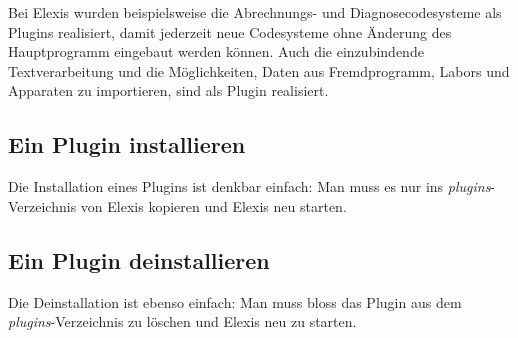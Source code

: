 Bei Elexis wurden beispielsweise die Abrechnungs- und Diagnosecodesysteme als Plugins realisiert, damit jederzeit neue Codesysteme ohne Änderung des Hauptprogramm eingebaut werden können. Auch die einzubindende Textverarbeitung und die Möglichkeiten, Daten aus Fremdprogramm, Labors und Apparaten zu importieren, sind als Plugin realisiert.

\subsection{Ein Plugin installieren}
Die Installation eines Plugins ist denkbar einfach: Man muss es nur ins \textit{plugins}-Verzeichnis von Elexis kopieren und Elexis neu starten.

\subsection{Ein Plugin deinstallieren}
Die Deinstallation ist ebenso einfach: Man muss bloss das Plugin aus dem \textit{plugins}-Verzeichnis zu löschen und Elexis neu zu starten.

